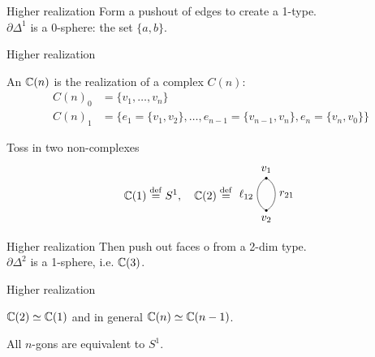 \documentclass[14pt,aspectratio=169]{beamer}
\begin{document}
\begin{frame}{Higher realization}
Form a pushout of edges to create a 1-type.
\[\]
\( \partial\Delta^1 \) is a 0-sphere: the set \( \{a, b\} \).
\end{frame}

\begin{frame}{Higher realization}
\vspace{5pt}\begin{definition}
An  \( \mathbb{C}(n) \) is the realization of a complex \( C(n) \):
\begin{align*}
C(n)_0 &= \{v_1,\ldots,v_n\} \\
C(n)_1 &= \{e_1=\{v_1,v_2\}, \ldots, e_{n-1}=\{v_{n-1}, v_n\}, e_n=\{v_n, v_0\}\}
\end{align*}
\end{definition}
\vspace{-15pt}Toss in two non-complexes \vspace{-20pt}
\[ \ccc(1)\defeq S^1,\quad \ccc(2)\defeq \begin{tikzpicture}[scale=0.5, baseline=3.5mm]
\tikzset{arrow/.style={-{Stealth[scale=1.1]}}}
\tikzset{oo/.style={circle, scale=0.25, fill=black}}
\tikzset{ooo/.style={circle, scale=0.25, fill=none}}
\node[oo, label=above:\( v_1 \)] (V1) at (0, 2) {};
\node[oo, label=below:\( v_2 \)] (V2) at (0, 0) {};
\node[ooo] (V21) at (0.3, 1.75) {};
\node[ooo] (V22) at (0.3, 0.25) {};
\draw (V1) edge[bend right=60, swap, "\( \ell_{12} \)"] (V2);
\draw (V1) edge[bend left=60, "\( r_{21} \)"] (V2);
\end{tikzpicture}\]
\end{frame}

\begin{frame}{Higher realization}
Then push out faces o from a 2-dim type.
\[\]
\( \partial\Delta^2 \) is a 1-sphere, i.e. \( \mathbb{C}(3) \).
\end{frame}

\begin{frame}{Higher realization}
\begin{lemma}
\( \mathbb{C}(2)\simeq \mathbb{C}(1) \) and in general \( \mathbb{C}(n)\simeq\mathbb{C}(n-1) \).
\end{lemma}
\begin{corollary}
All \( n \)-gons are equivalent to \( S^1 \).
\end{corollary}
\end{frame}
\end{document}
